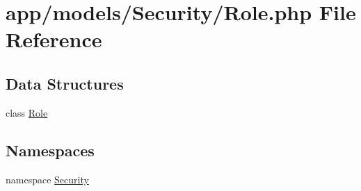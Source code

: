 \hypertarget{_role_8php}{\section{app/models/\-Security/\-Role.php File Reference}
\label{_role_8php}
}
\subsection*{Data Structures}
\begin{DoxyCompactItemize}
\item 
class \hyperlink{class_security_1_1_role}{Role}
\end{DoxyCompactItemize}
\subsection*{Namespaces}
\begin{DoxyCompactItemize}
\item 
namespace \hyperlink{namespace_security}{Security}
\end{DoxyCompactItemize}
